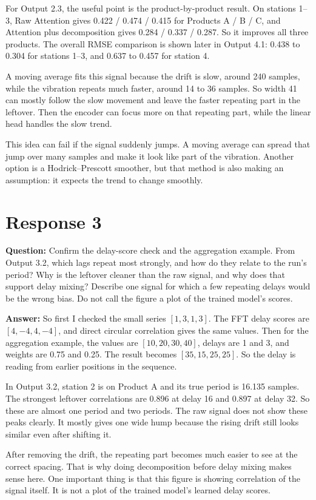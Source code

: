 \documentclass[11pt]{article}
\begin{document}
For Output 2.3, the useful point is the product-by-product result. On stations 1--3, Raw Attention gives 0.422 / 0.474 / 0.415 for Products A / B / C, and Attention plus decomposition gives 0.284 / 0.337 / 0.287. So it improves all three products. The overall RMSE comparison is shown later in Output 4.1: 0.438 to 0.304 for stations 1--3, and 0.637 to 0.457 for station 4.

A moving average fits this signal because the drift is slow, around 240 samples, while the vibration repeats much faster, around 14 to 36 samples. So width 41 can mostly follow the slow movement and leave the faster repeating part in the leftover. Then the encoder can focus more on that repeating part, while the linear head handles the slow trend.

This idea can fail if the signal suddenly jumps. A moving average can spread that jump over many samples and make it look like part of the vibration. Another option is a Hodrick--Prescott smoother, but that method is also making an assumption: it expects the trend to change smoothly.

\section*{Response 3}
\textbf{Question:} Confirm the delay-score check and the aggregation example. From Output 3.2, which lags repeat most strongly, and how do they relate to the run's period? Why is the leftover cleaner than the raw signal, and why does that support delay mixing? Describe one signal for which a few repeating delays would be the wrong bias. Do not call the figure a plot of the trained model's scores.

\textbf{Answer:} So first I checked the small series $[1, 3, 1, 3]$. The FFT delay scores are $[4, -4, 4, -4]$, and direct circular correlation gives the same values. Then for the aggregation example, the values are $[10, 20, 30, 40]$, delays are 1 and 3, and weights are 0.75 and 0.25. The result becomes $[35, 15, 25, 25]$. So the delay is reading from earlier positions in the sequence.

In Output 3.2, station 2 is on Product A and its true period is 16.135 samples. The strongest leftover correlations are 0.896 at delay 16 and 0.897 at delay 32. So these are almost one period and two periods. The raw signal does not show these peaks clearly. It mostly gives one wide hump because the rising drift still looks similar even after shifting it.

After removing the drift, the repeating part becomes much easier to see at the correct spacing. That is why doing decomposition before delay mixing makes sense here. One important thing is that this figure is showing correlation of the signal itself. It is not a plot of the trained model's learned delay scores.
\end{document}

